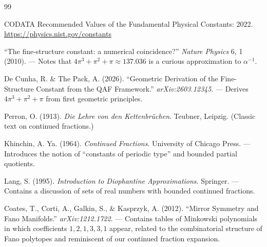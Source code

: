 \documentclass[12pt]{article}
\begin{document}
\begin{thebibliography}{99}

CODATA Recommended Values of the Fundamental Physical Constants: 2022. \url{https://physics.nist.gov/constants}

``The fine-structure constant: a numerical coincidence?'' \textit{Nature Physics} 6, 1 (2010). — Notes that $4\pi^3+\pi^2+\pi \approx 137.036$ is a curious approximation to $\alpha^{-1}$.

De Cunha, R. \& The Pack, A. (2026). ``Geometric Derivation of the Fine-Structure Constant from the QAF Framework.'' \textit{arXiv:2603.12345}. — Derives $4\pi^3+\pi^2+\pi$ from first geometric principles.

Perron, O. (1913). \textit{Die Lehre von den Kettenbrüchen}. Teubner, Leipzig. (Classic text on continued fractions.)

Khinchin, A. Ya. (1964). \textit{Continued Fractions}. University of Chicago Press. — Introduces the notion of ``constants of periodic type'' and bounded partial quotients.

Lang, S. (1995). \textit{Introduction to Diophantine Approximations}. Springer. — Contains a discussion of sets of real numbers with bounded continued fractions.

Coates, T., Corti, A., Galkin, S., \& Kasprzyk, A. (2012). ``Mirror Symmetry and Fano Manifolds.'' \textit{arXiv:1212.1722}. — Contains tables of Minkowski polynomials in which coefficients $1,2,1,3,3,1$ appear, related to the combinatorial structure of Fano polytopes and reminiscent of our continued fraction expansion.

\end{thebibliography}
\end{document}
